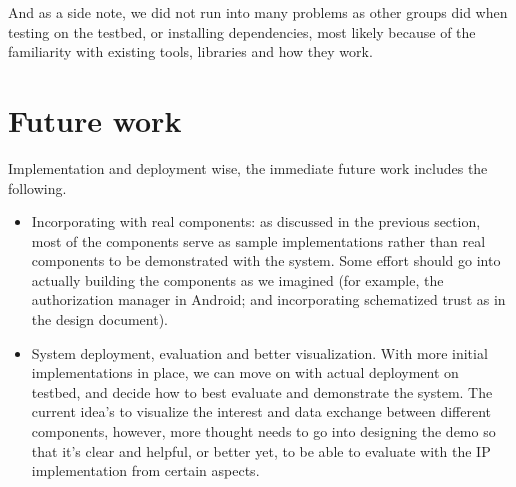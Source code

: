 \documentclass[letterpaper,twocolumn,11pt]{article}
\begin{document}
And as a side note, we did not run into many problems as other groups did when testing on the testbed, or installing dependencies, most likely because of the familiarity with existing tools, libraries and how they work.

\section{Future work}

Implementation and deployment wise, the immediate future work includes the following.

\begin{itemize}

\item Incorporating with real components: as discussed in the previous section, most of the components serve as sample implementations rather than real components to be demonstrated with the system. Some effort should go into actually building the components as we imagined (for example, the authorization manager in Android; and incorporating schematized trust as in the design document).

\item System deployment, evaluation and better visualization. With more initial implementations in place, we can move on with actual deployment on testbed, and decide how to best evaluate and demonstrate the system. The current idea's to visualize the interest and data exchange between different components, however, more thought needs to go into designing the demo so that it's clear and helpful, or better yet, to be able to evaluate with the IP implementation from certain aspects.

\end{itemize}

{\footnotesize 
}
\end{document}
